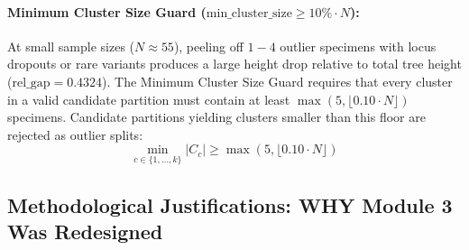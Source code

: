 \documentclass[11pt,a4paper]{article}
\begin{document}
\paragraph{Minimum Cluster Size Guard ($\text{min\_cluster\_size} \ge 10\% \cdot N$):}
At small sample sizes ($N \approx 55$), peeling off $1-4$ outlier specimens with locus dropouts or rare variants produces a large height drop relative to total tree height ($\text{rel\_gap} = 0.4324$). The Minimum Cluster Size Guard requires that every cluster in a valid candidate partition must contain at least $\max(5, \lfloor 0.10 \cdot N \rfloor)$ specimens. Candidate partitions yielding clusters smaller than this floor are rejected as outlier splits:
\begin{equation}
\min_{c \in \{1, \dots, k\}} |C_c| \ge \max(5, \lfloor 0.10 \cdot N \rfloor)
\end{equation}

\subsection{Methodological Justifications: WHY Module 3 Was Redesigned}
\end{document}
